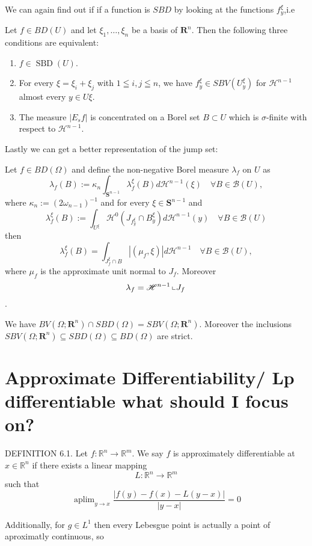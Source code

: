 We can again find out if if a function is $SBD$ by looking at the functions $f_y^\xi$,i.e
\begin{proposition}
 Let $f \in B D(U)$ and let $\xi_1, \ldots, \xi_n$ be a basis of $\mathbf{R}^n$. Then the following three conditions are equivalent:
 \begin{enumerate}
 \item $f \in \operatorname{SBD}(U)$.
\item  For every $\xi=\xi_i+\xi_j$ with $1 \leqq i, j \leqq n$, we have $f_y^{\xi} \in S B V\left(U_y^{\xi}\right)$ for $\mathscr{H}^{n-1}$ almost every $y \in U \xi$.
\item The measure $\left|E_s f\right|$ is concentrated on a Borel set $B \subset U$ which is $\sigma$-finite with respect to $\mathscr{H}^{n-1}$.
\end{enumerate}
\end{proposition}

Lastly we can get a better representation of the jump set:
\begin{theorem}
Let $f \in B D(\Omega)$ and define the non-negative Borel measure $\lambda_f$ on $U$ as
$$
\lambda_f(B):=\kappa_n \int_{\mathbf{S}^{n-1}} \lambda_f^{\xi}(B) d \mathscr{H}^{n-1}(\xi) \quad \forall B \in \mathscr{B}(U),
$$
where $\kappa_n:=\left(2 \omega_{n-1}\right)^{-1}$ and for every $\xi \in \mathbf{S}^{n-1}$ and
$$
\lambda_f^{\xi}(B):=\int_{U^{\xi}} \mathscr{H}^0\left(J_{f_y^{\xi}} \cap B_y^{\xi}\right) d \mathscr{H}^{n-1}(y) \quad \forall B \in \mathscr{B}(U)
$$
then
$$
\lambda_f^\xi(B)=\int_{J_f^{\xi} \cap B}\left|\left(\mu_f, \xi\right)\right| d \mathscr{H}^{n-1} \quad \forall B \in \mathscr{B}(U),
$$
where $\mu_f$ is the approximate unit normal to $J_f$. Moreover $$\lambda_f=\mathscr{H}^{n-1}\left\llcorner J_f\right.$$.
\end{theorem}
\begin{theorem}
We have $B V\left(\Omega ; \mathbf{R}^n\right) \cap S B D(\Omega)=S B V\left(\Omega ; \mathbf{R}^n\right)$. Moreover the inclusions $S B V\left(\Omega ; \mathbf{R}^n\right) \subseteq S B D(\Omega) \subseteq B D(\Omega)$ are strict.
\end{theorem}

\section{Approximate Differentiability/ Lp differentiable what should I focus on?}


\begin{definition}
DEFINITION 6.1. Let $f: \mathbb{R}^n \rightarrow \mathbb{R}^m$. We say $f$ is approximately differentiable at $x \in \mathbb{R}^n$ if there exists a linear mapping
$$
L: \mathbb{R}^n \rightarrow \mathbb{R}^m
$$
such that
$$
\operatorname{aplim}_{y \rightarrow x} \frac{|f(y)-f(x)-L(y-x)|}{|y-x|}=0
$$
\end{definition}
Additionally, for $g\in L^1$ then every Lebesgue point is actually a point of aproximatly continuous, so

